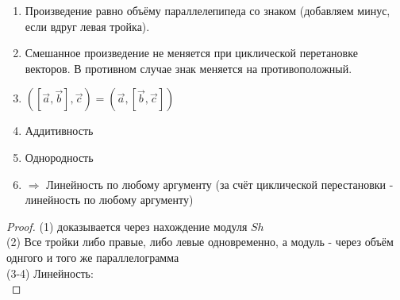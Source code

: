 \documentclass[12pt, a4paper]{article}
\begin{document}
    \begin{property}
        \begin{enumerate}
            \item Произведение равно объёму параллелепипеда со знаком (добавляем минус, если вдруг левая тройка).
            \item Смешанное произведение не меняется при циклической перетановке векторов. 
            В противном случае знак меняется на противоположный.
            \item $([\vec{a}, \vec{b}], \vec{c}) = (\vec{a}, [\vec{b}, \vec{c}])$
            \item Аддитивность
            \item Однородность
            \item $\Rightarrow$ Линейность по любому аргументу (за счёт циклической перестановки - линейность по любому аргументу)
        \end{enumerate}
    \end{property}
    \begin{proof} \nl
        (1) доказывается через нахождение модуля $Sh$ \\
        (2) Все тройки либо правые, либо левые одновременно, а модуль - через объём однгого и того же параллелограмма \\
        (3-4) Линейность:  \\
    \end{proof}
\end{document}
